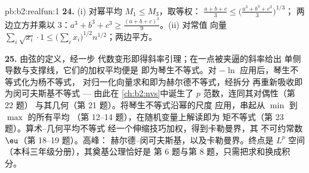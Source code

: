 \begin{solution}{pb:b2:realfun:1}
\textbf{24.} (i) 对幂平均 $M_1 \leq M_3$，取等权：
$\frac{a+b+c}3 \leq \bigl(\frac{a^3+b^3+c^3}3\bigr)^{1/3}$；
两边立方并乘以 $3$：$a^3 + b^3 + c^3 \geq
\frac{(a+b+c)^3}9$。(ii) 对常值
向量 $\sum_i\sqrt{x_i}\cdot1 \leq
\bigl(\sum_ix_i\bigr)^{1/2}n^{1/2}$；两边平方。

\textbf{25.} 由弦的定义，经一步
代数变形即得斜率引理；在一点被夹逼的斜率给出
单侧导数与支撑线，它们的加权平均便是
即为琴生不等式。对 $-\ln$ 应用后，琴生不等式化为杨不等式，
对归一化向量求和即为赫尔德不等式，经拆分
再重新吸收即为闵可夫斯基不等式 --- 由此在
\cref{ch:b2:nvs}中诞生了 $p$ 范数，连同其对偶性（第 22 题）
与其几何（第 21 题）。将琴生不等式沿幂的尺度
应用，串起从 $\min$ 到 $\max$ 的所有平均
（第 12--14 题），在随机变量上解读即为
矩不等式（第 23 题）。算术–几何平均不等式
经一个伸缩技巧加权，得到卡勒曼界，其
不可约常数 $\eu$（第 18--19 题）。高峰：
赫尔德–闵可夫斯基，以及卡勒曼界。终点是 $L^p$
空间（本科三年级分册），其奠基公理恰好是
第 6 题与第 8 题，只需把求和换成积分。
\end{solution}
